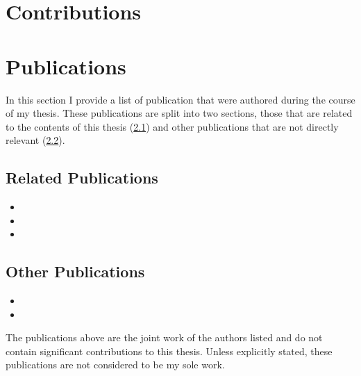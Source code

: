 \section{Contributions}\label{sec:intro_contrib}

\section{Publications}\label{sec:intro_pubs}
In this section I provide a list of publication that were authored during the
course of my thesis. These publications are split into two sections, those
that are related to the contents of this thesis 
(\cref{subsec:intro_rel_pubs}) and other publications that 
are not directly relevant (\cref{subsec:intro_other_pubs}).
\subsection{Related Publications}\label{subsec:intro_rel_pubs}
\begin{itemize}
	\item{}
	\item{}
	\item{}
\end{itemize}
\subsection{Other Publications}\label{subsec:intro_other_pubs}
\begin{itemize}
	\item{}
	\item{}
\end{itemize}
The publications above are the joint work of the authors listed and do not
contain significant contributions to this thesis. Unless explicitly stated,
these publications are not considered to be my sole work.
